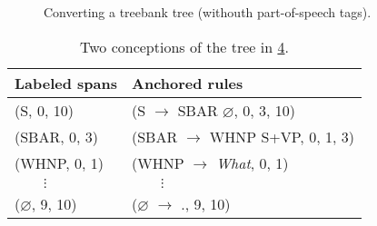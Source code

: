     \begin{figure}

      \begin{subfigure}[b]{\textwidth}
        \center
        \begin{tikzpicture}[scale=.6]
          
        \end{tikzpicture}
    		\label{fig:tree-original}
      \end{subfigure}

      \begin{subfigure}[b]{\textwidth}
        \center
        \begin{tikzpicture}[scale=.6]
    		  
        \end{tikzpicture}
        \tiny
    		\label{fig:tree-simplified}
      \end{subfigure}

      \begin{subfigure}[b]{\textwidth}
        \center
        \begin{tikzpicture}[scale=.6]
    		  
        \end{tikzpicture}
        \tiny
    		\label{fig:tree-cnf}
      \end{subfigure}

      \begin{subfigure}[b]{\textwidth}
        \center
        \begin{tikzpicture}[scale=.6]
    		  
        \end{tikzpicture}
        \tiny
    		\label{fig:tree-cnf-spans}
      \end{subfigure}

    \caption{Converting a treebank tree (withouth part-of-speech tags).}
    \label{fig:trees-ptb}
    \end{figure}

    \begin{table}[h]
      \center
      \small
      \bgroup  %
      \def\arraystretch{1.5}  %
      \begin{tabular}{l|l}
        Labeled spans & Anchored rules \\
        \hline
        (S, 0, 10)     & (S $\to$ SBAR $\varnothing$, 0, 3, 10)  \\
        (SBAR, 0, 3)   & (SBAR $\to$ WHNP S+VP, 0, 1, 3)  \\
        (WHNP, 0, 1)     & (WHNP $\to$ \textit{What}, 0, 1)  \\
        $\qquad\vdots$ & $\qquad\vdots$  \\
        ($\varnothing$, 9, 10)     & ($\varnothing$ $\to$ ., 9, 10)  \\
      \end{tabular}
      \caption{Two conceptions of the tree in \ref{fig:tree-cnf-spans}.}
      \label{tab:spans-rules}
      \egroup  %
    \end{table}


